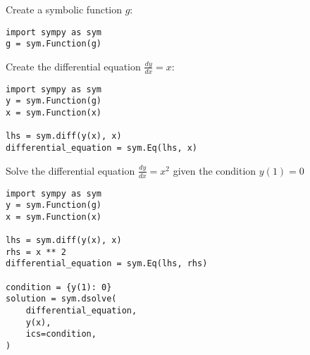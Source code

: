 \documentclass{article}
\begin{document}
\begin{multicols}{2}

    Create a symbolic function $g$:

        \begin{verbatim}
import sympy as sym
g = sym.Function(g)
\end{verbatim}

    Create the differential equation $\frac{dy}{dx}=x$:

        \begin{verbatim}
import sympy as sym
y = sym.Function(g)
x = sym.Function(x)

lhs = sym.diff(y(x), x)
differential_equation = sym.Eq(lhs, x)
\end{verbatim}

    \vspace{2cm}

    Solve the differential equation $\frac{dy}{dx}=x ^ 2$ given the condition
    $y(1)=0$

        \begin{verbatim}
import sympy as sym
y = sym.Function(g)
x = sym.Function(x)

lhs = sym.diff(y(x), x)
rhs = x ** 2
differential_equation = sym.Eq(lhs, rhs)

condition = {y(1): 0}
solution = sym.dsolve(
    differential_equation,
    y(x),
    ics=condition,
)
\end{verbatim}

\end{multicols}
\end{document}
